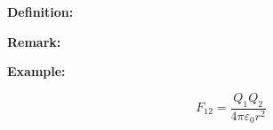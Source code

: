 \documentclass[11pt, a4paper]{article}
\title{}
\begin{document}
\maketitle

\textbf{Definition:}

\textbf{Remark:}

\textbf{Example:}

\begin{equation}
F_{12}=\frac{Q_1Q_2}{4\pi\varepsilon_0r^2}
\end{equation}
\end{document}
